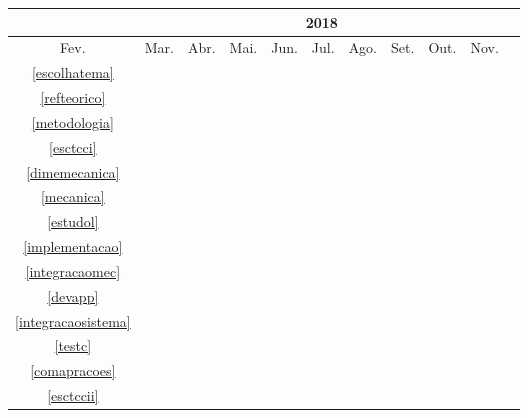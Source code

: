 \begin{table}[!htbp]
	\centering
		\begin{tabular}{|c|c|c|c|c|c|c|c|c|c|c|}
		\hline
		&\multicolumn{9}{c|}{2018}\\
		\hline
		Fev.&Mar.&Abr.&Mai.&Jun.&Jul.&Ago.&Set.&Out.&Nov.\\
		\hline
		\ref{escolhatema}&\cellcolor{midgray}&&&&&&&&\\
		\hline
		\ref{refteorico}&&\cellcolor{midgray}&\cellcolor{midgray}&\cellcolor{midgray}&&&&&\\
		\hline
		\ref{metodologia}&&&\cellcolor{midgray}&\cellcolor{midgray}&&&&&\\
		\hline
		\ref{esctcci}&&\cellcolor{midgray}&\cellcolor{midgray}&\cellcolor{midgray}&&&&&\\
		\hline
		\ref{dimemecanica}&&&&&\cellcolor{midgray}&&&&\\
		\hline
		\ref{mecanica}&&&&&\cellcolor{midgray}&\cellcolor{midgray}&&&\\
		\hline	
		\ref{estudol}&&&&&&\cellcolor{midgray}&&&\\
		\hline
		\ref{implementacao}&&&&&&\cellcolor{midgray}&\cellcolor{midgray}&\cellcolor{midgray}&\\
		\hline
		\ref{integracaomec}&&&&&&&\cellcolor{midgray}&\cellcolor{midgray}&\\
		\hline
		\ref{devapp}&&&&&&&&\cellcolor{midgray}&\\
		\hline	
		\ref{integracaosistema}&&&&&&&&\cellcolor{midgray}&\\
		\hline	
		\ref{testc}&&&&&&&&\cellcolor{midgray}&\\
		\hline	
		\ref{comapracoes}&&&&&&&\cellcolor{midgray}&\cellcolor{midgray}&\cellcolor{midgray}\\
		\hline
		\ref{esctccii}&&&&&&&\cellcolor{midgray}&\cellcolor{midgray}&\cellcolor{midgray}\\
		\hline		
		\end{tabular}
\end{table}